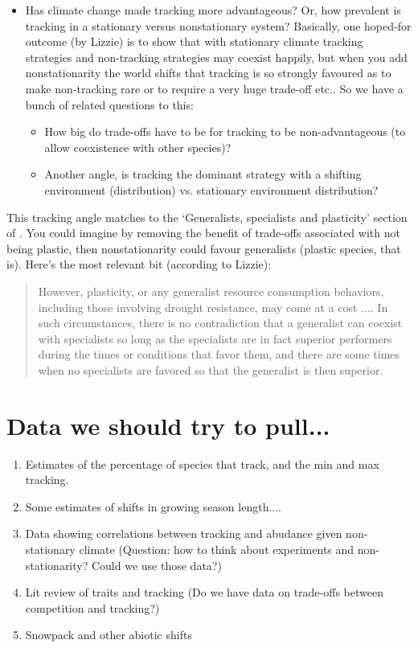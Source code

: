 \documentclass[11pt,letterpaper]{article}
\begin{document}
\begin{itemize}
\item Has climate change made tracking more advantageous? Or, how prevalent is tracking in a stationary versus nonstationary system? Basically, one hoped-for outcome (by Lizzie) is to show that with stationary climate tracking strategies and non-tracking strategies may coexist happily, but when you add nonstationarity the world shifts that tracking is so strongly favoured as to make non-tracking rare or to require a very huge trade-off etc.. So we have a bunch of related questions to this:
\begin{itemize}
\item How big do trade-offs have to be for tracking to be non-advantageous (to allow coexistence with other species)?
\item Another angle, is tracking the dominant strategy with a shifting environment (distribution) vs. stationary environment distribution?
\end{itemize}
\end{itemize}

\noindent This tracking angle matches to the `Generalists, specialists and plasticity' section of \citet{Chesson:2004eo}. You could imagine by removing the benefit of trade-offs associated with not being plastic, then nonstationarity could favour generalists (plastic species, that is). Here's the most relevant bit (according to Lizzie):
\begin{quote}
However, plasticity, or any generalist resource consumption
behaviors, including those involving drought resistance,
may come at a cost .... In such circumstances, there is no
contradiction that a generalist can coexist with specialists
so long as the specialists are in fact superior performers
during the times or conditions that favor them, and there 
are some times when no specialists are favored so that the
generalist is then superior.
\end{quote}


\section{Data we should try to pull...}
\begin{enumerate}
\item Estimates of the percentage of species that track, and the min and max tracking.
\item Some estimates of shifts in growing season length....
\item Data showing correlations between tracking and abudance given non-stationary climate (Question: how to think about experiments and non-stationarity? Could we use those data?)
\item Lit review of traits and tracking (Do we have data on trade-offs between competition and tracking?)
\item Snowpack and other abiotic shifts
\end{enumerate}
\end{document}
